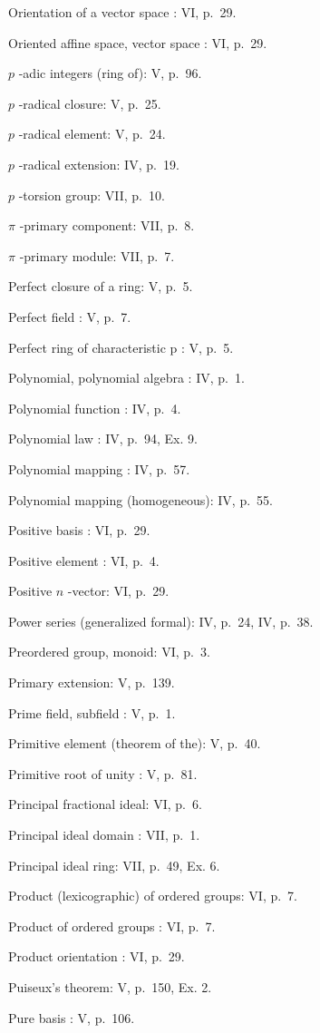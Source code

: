 Orientation of a vector space : VI, p.~29.

Oriented affine space, vector space : VI, p.~29.

\(p\) -adic integers (ring of): V, p.~96.

\(p\) -radical closure: V, p.~25.

\(p\) -radical element: V, p.~24.

\(p\) -radical extension: IV, p.~19.

\(p\) -torsion group: VII, p.~10.

\(\pi\) -primary component: VII, p.~8.

\(\pi\) -primary module: VII, p.~7.

Perfect closure of a ring: V, p.~5.

Perfect field : V, p.~7.

Perfect ring of characteristic p : V, p.~5.

Polynomial, polynomial algebra : IV, p.~1.

Polynomial function : IV, p.~4.

Polynomial law : IV, p.~94, Ex. 9.

Polynomial mapping : IV, p.~57.

Polynomial mapping (homogeneous): IV, p.~55.

Positive basis : VI, p.~29.

Positive element : VI, p.~4.

Positive \(n\) -vector: VI, p.~29.

Power series (generalized formal): IV, p.~24, IV, p.~38.

Preordered group, monoid: VI, p.~3.

Primary extension: V, p.~139.

Prime field, subfield : V, p.~1.

Primitive element (theorem of the): V, p.~40.

Primitive root of unity : V, p.~81.

Principal fractional ideal: VI, p.~6.

Principal ideal domain : VII, p.~1.

Principal ideal ring: VII, p.~49, Ex. 6.

Product (lexicographic) of ordered groups: VI, p.~7.

Product of ordered groups : VI, p.~7.

Product orientation : VI, p.~29.

Puiseux's theorem: V, p.~150, Ex. 2.

Pure basis : V, p.~106.

